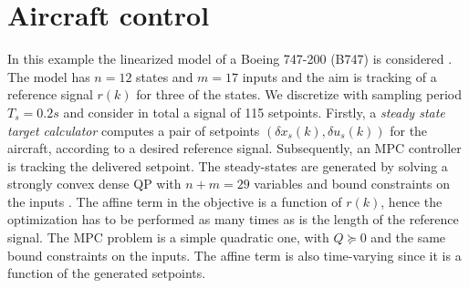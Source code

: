 \documentclass[openany]{now}
\begin{document}
\section{Aircraft control}
In this example the linearized model of a Boeing 747-200 (B747) is considered \cite{B747}. The model has $n=12$ states and $m=17$ inputs and the aim is tracking of a reference signal $r(k)$ for three of the states. We discretize with sampling period $T_s=0.2s$ and consider in total a signal of 115 setpoints. Firstly, a \emph{steady state target calculator} computes a pair of setpoints $(\delta x_s(k),\delta u_s(k))$ for the aircraft, according to a desired reference signal. Subsequently, an MPC controller is tracking the delivered setpoint.
The steady-states are generated by solving a strongly convex dense QP with $n+m=29$ variables and bound constraints on the inputs \cite[Section~II,B]{B747}. The affine term in the objective is a function of $r(k)$, hence the optimization has to be performed as many times as is the length of the reference signal. The MPC problem is a simple quadratic one, with $Q\succeq 0$ and the same bound constraints on the inputs. The affine term is also time-varying since it is a function of the generated setpoints.
\end{document}
